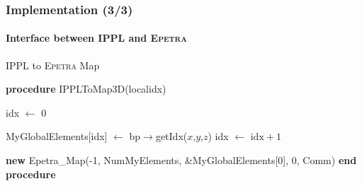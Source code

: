 \documentclass[xcolor=pdftex,table,10pt]{beamer}
\begin{document}
    \begin{frame}
        \frametitle{Implementation (3/3)}
        \framesubtitle{Interface between \textsc{IPPL} and \textsc{Epetra}}

        \begin{block}{\textsc{IPPL} to \textsc{Epetra} Map}
        \begin{algorithmic}[1]
            \STATE \textbf{procedure} IPPLToMap3D(localidx)

            \STATE idx $\leftarrow$ 0

                        \STATE MyGlobalElements[idx] $\leftarrow$ bp$\rightarrow$getIdx($x$,$y$,$z$)
                        \STATE idx $\leftarrow$ $\text{idx} + 1$
                    \ENDFOR
                \ENDFOR
            \ENDFOR
            
            \RETURN \textbf{new} Epetra\_Map(-1, NumMyElements, \&MyGlobalElements[0], 0, Comm)
            \STATE \textbf{end procedure}
          \end{algorithmic}
        \end{block}

    \end{frame}
    
\end{document}
